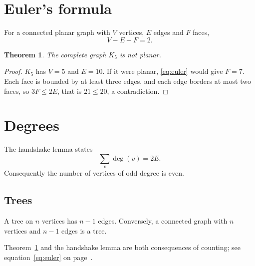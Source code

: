\documentclass[11pt,a4paper]{article}
\newtheorem{theorem}{Theorem}
\begin{document}
\section{Euler's formula}
For a connected planar graph with $V$ vertices, $E$ edges and $F$ faces,
\begin{equation}\label{eq:euler}
V-E+F=2.
\end{equation}

\begin{theorem}\label{thm:k5}
The complete graph $K_5$ is not planar.
\end{theorem}
\begin{proof}
$K_5$ has $V=5$ and $E=10$. If it were planar, \eqref{eq:euler} would give $F=7$. Each face is bounded by at least three edges, and each edge borders at most two faces, so $3F\le 2E$, that is $21\le 20$, a contradiction.
\end{proof}

\section{Degrees}
The handshake lemma states
\[
\sum_{v}\deg(v)=2E.
\]
Consequently the number of vertices of odd degree is even.

\subsection{Trees}
A tree on $n$ vertices has $n-1$ edges. Conversely, a connected graph with $n$ vertices and $n-1$ edges is a tree.

Theorem~\ref{thm:k5} and the handshake lemma are both consequences of counting; see equation~\eqref{eq:euler} on page~\pageref{eq:euler}.
\end{document}
